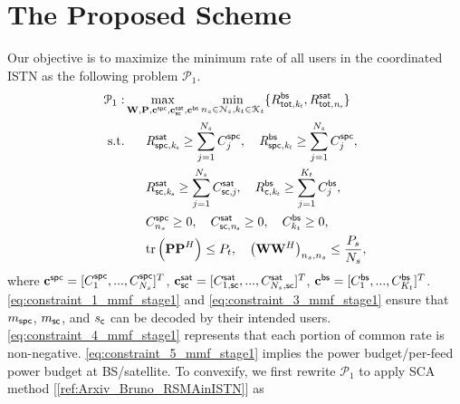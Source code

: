 \documentclass[draftclsnofoot, onecolumn, comsoc, 12pt]{IEEEtran}
\begin{document}
\section{The Proposed Scheme}
{Our objective is to maximize the minimum rate of all users in the coordinated ISTN as the following problem $\mathcal{P}_{1}$. }
\begin{align} \label{eq:mmf_stage1}
\mathcal{P}_{1}:
&\mathop{{\text{max}}}_{{\bf{W}}, {\bf{P}}, {\bf{c}}^{\sf{spc}}, {\bf{c}}_{\sf{sc}}^{\sf{sat}}, {\bf{c}}^{\sf{bs}}} \mathop{\text{min}}_{n_{s} \in \mathcal{N}_{s}, k_{t} \in \mathcal{K}_{t}} \{R_{\sf{tot}, \it{k_{t}}}^{\sf{bs}}, R_{\sf{tot}, \it{n_{s}}}^{\sf{sat}}\}\\
{\text{s.t.}} 
&\;\;\;\;\;\; \mathit{R}_{\sf{spc}, \it{k_{s}}}^{\sf{sat}} \geq \sum_{j=1}^{N_{s}} C^{\sf{spc}}_{j}, \quad \mathit{R}_{\sf{spc}, \it{k_{t}}}^{\sf{bs}} \geq \sum_{j=1}^{N_{s}} C^{\sf{spc}}_{j},
\label{eq:constraint_1_mmf_stage1}  \\
&\;\;\;\;\;\; R_{\sf{sc}, \it{k_{s}}}^{\sf{sat}} \geq \sum_{j=1}^{N_{s}} C_{\sf{sc},\it{j}}^{\sf{sat}}, \quad R_{\sf{c}, \it{k_{t}}}^{\sf{bs}} \geq \sum_{j=1}^{K_{t}} C_{j}^{\sf{bs}},
\label{eq:constraint_3_mmf_stage1} \\
&\;\;\;\;\;\; C^{\sf{spc}}_{n_{s}} \geq 0, \quad C_{\sf{sc},\it{n_{s}}}^{\sf{sat}} \geq 0, \quad C_{k_{t}}^{\sf{bs}} \geq 0,
\label{eq:constraint_4_mmf_stage1} \\
&\;\;\;\;\;\; \mathrm{tr}\left(\mathbf{P P}^{H}\right) \leq P_{t}, \quad \left(\mathbf{W} \mathbf{W}^{H}\right)_{n_{s}, n_{s}} \leq \frac{P_{s}}{N_{s}},
\label{eq:constraint_5_mmf_stage1}
\end{align}
{where $\mathbf{c}^{\sf{spc}} = [C^{\sf{spc}}_{1},...,C^{\sf{spc}}_{N_{s}}]^{T}$,
$\mathbf{c}_{\sf{sc}}^{\sf{sat}} = [C_{1,\sf{sc}}^{\sf{sat}},...,C_{N_{s},\sf{sc}}^{\sf{sat}}]^{T}$,
$\mathbf{c}^{\sf{bs}} = [C_{1}^{\sf{bs}},...,C_{K_{t}}^{\sf{bs}}]^{T}$.
\mbox{\eqref{eq:constraint_1_mmf_stage1}} and \mbox{\eqref{eq:constraint_3_mmf_stage1}} ensure that $m_{\sf{spc}}$, $m_{\sf{sc}}$, and $s_{\sf{c}}$ can be decoded by their intended users. 
\mbox{\eqref{eq:constraint_4_mmf_stage1}} represents that each portion of common rate is non-negative. 
\mbox{\eqref{eq:constraint_5_mmf_stage1}} implies the power budget/per-feed power budget at BS/satellite. 
To convexify, we first rewrite $\mathcal{P}_{1}$ to apply SCA method \mbox{[\ref{ref:Arxiv_Bruno_RSMAinISTN}]} as 
}
\end{document}

